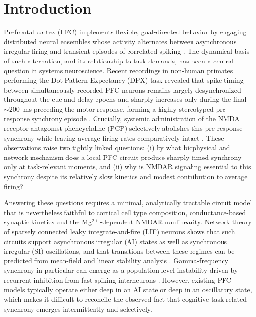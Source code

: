 \documentclass[11pt]{article}
\begin{document}
\section{Introduction}

Prefrontal cortex (PFC) implements flexible, goal-directed behavior by engaging distributed neural ensembles whose activity alternates between asynchronous irregular firing and transient episodes of correlated spiking \citep{goldmanrakic1995cellular,abeles1991corticonics}. The dynamical basis of such alternation, and its relationship to task demands, has been a central question in systems neuroscience. Recent recordings in non-human primates performing the Dot Pattern Expectancy (DPX) task revealed that spike timing between simultaneously recorded PFC neurons remains largely desynchronized throughout the cue and delay epochs and sharply increases only during the final $\sim 200$~ms preceding the motor response, forming a highly stereotyped pre-response synchrony episode \citep{zick2018differential}. Crucially, systemic administration of the NMDA receptor antagonist phencyclidine (PCP) selectively abolishes this pre-response synchrony while leaving average firing rates comparatively intact \citep{zick2018differential,krystal1994subanesthetic,javitt1991recent,homayoun2007nmda}. These observations raise two tightly linked questions: (i) by what biophysical and network mechanism does a local PFC circuit produce sharply timed synchrony only at task-relevant moments, and (ii) why is NMDAR signaling essential to this synchrony despite its relatively slow kinetics and modest contribution to average firing?

Answering these questions requires a minimal, analytically tractable circuit model that is nevertheless faithful to cortical cell type composition, conductance-based synaptic kinetics and the Mg$^{2+}$-dependent NMDAR nonlinearity. Network theory of sparsely connected leaky integrate-and-fire (LIF) neurons \citep{brunel2000dynamics,brunel1999fast,vanvreeswijk1996chaos} shows that such circuits support asynchronous irregular (AI) states as well as synchronous irregular (SI) oscillations, and that transitions between these regimes can be predicted from mean-field and linear stability analysis \citep{amit1997model,brunel2001effects,renart2003mean}. Gamma-frequency synchrony in particular can emerge as a population-level instability driven by recurrent inhibition from fast-spiking interneurons \citep{buzsaki2012mechanisms,cardin2009driving,sohal2009parvalbumin,fries2007gamma}. However, existing PFC models typically operate either deep in an AI state or deep in an oscillatory state, which makes it difficult to reconcile the observed fact that cognitive task-related synchrony emerges intermittently and selectively.
\end{document}
